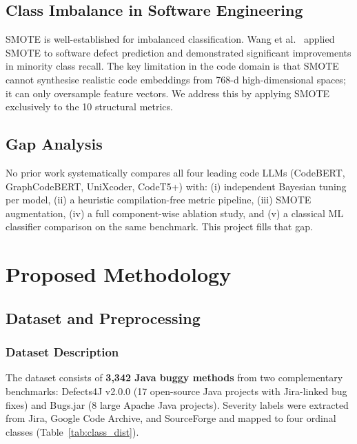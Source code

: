 \documentclass[12pt, a4paper]{report}
\begin{document}
\section{Class Imbalance in Software Engineering}

SMOTE \cite{smote} is well-established for imbalanced classification. Wang et al.\ \cite{ref5} applied SMOTE to software defect prediction and demonstrated significant improvements in minority class recall. The key limitation in the code domain is that SMOTE cannot synthesise realistic code embeddings from 768-d high-dimensional spaces; it can only oversample feature vectors. We address this by applying SMOTE exclusively to the 10 structural metrics.

\section{Gap Analysis}

No prior work systematically compares all four leading code LLMs (CodeBERT, GraphCodeBERT, UniXcoder, CodeT5+) with: (i) independent Bayesian tuning per model, (ii) a heuristic compilation-free metric pipeline, (iii) SMOTE augmentation, (iv) a full component-wise ablation study, and (v) a classical ML classifier comparison on the same benchmark. This project fills that gap.

\clearpage
\chapter{Proposed Methodology}

\section{Dataset and Preprocessing}

\subsection{Dataset Description}

The dataset consists of \textbf{3,342 Java buggy methods} from two complementary benchmarks: Defects4J v2.0.0 \cite{defects4j} (17 open-source Java projects with Jira-linked bug fixes) and Bugs.jar \cite{bugsjar} (8 large Apache Java projects). Severity labels were extracted from Jira, Google Code Archive, and SourceForge and mapped to four ordinal classes (Table~\ref{tab:class_dist}).
\end{document}
